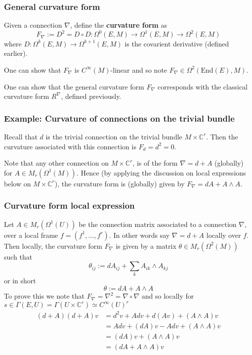 \documentclass[a4paper]{article}
\theoremstyle{definition} \newtheorem*{definition}{Definition}
\theoremstyle{definition} \newtheorem*{definitions}{Definitions}
\theoremstyle{plain} \newtheorem{theorem}{Theorem}[section]
\theoremstyle{plain} \newtheorem{proposition}[theorem]{Proposition}
\theoremstyle{plain} \newtheorem{corollary}[theorem]{Corollary}
\theoremstyle{plain} \newtheorem{lemma}[theorem]{Lemma}
\theoremstyle{plain} \newtheorem{example}[theorem]{Example}
\newcommand{\defn}[1]{\textbf{#1}}
\newcommand{\complexnos}{\mathbb{C}}
\newcommand{\End}{\text{End}}
\newcommand{\smooth}{C^\infty}
\begin{document}
\subsubsection{General curvature form}
Given a connection $\nabla$, define the \defn{curvature form} as
$$F_\nabla := D^2 = D\circ D: \Omega^0(E, M)\to \Omega^1(E, M) \to \Omega^2(E, M)$$
where $D:\Omega^k(E, M)\to \Omega^{k+1}(E, M)$ is the covarient derivative (defined earlier). 

One can show that $F_\nabla$ is $\smooth(M)$-linear and so note $F_\nabla \in \Omega^2(\End(E), M)$. 

One can show that the general curvature form $F_\nabla$ corresponds with the classical curvature form $R^\nabla$, defined previously.

\subsubsection{Example: Curvature of connections on the trivial bundle}
Recall that $d$ is the trivial connection on the trivial bundle $M\times \complexnos^r$. Then the curvature associated with this connection is
$F_d = d^2 = 0$.

Note that any other connection on $M\times \complexnos^r$, is of the form $\nabla = d+A$ (globally) for $A\in M_r(\Omega^1(M))$. Hence (by applying the discussion on local expressions below on $M\times \complexnos^r$), the curvature form is (globally) given by $F_\nabla = dA+A\wedge A$. 

\subsubsection{Curvature form local expression}
Let $A\in M_r(\Omega^1(U))$ be the connection matrix associated to a connection $\nabla$, over a local frame $f=(f^1, \ldots , f^r)$. In other words say $\nabla=d+A$ locally over $f$. Then locally, the curvature form $F_\nabla$ is given by a matrix $\theta \in M_r(\Omega^2(M))$ such that
$$\mathbb{\theta}_{ij} := dA_{ij} + \sum_k A_{ik}\wedge A_{kj}$$
or in short
$$\mathbb{\theta} := dA + A\wedge A$$
To prove this we note that $F_\nabla = \nabla^2 = \nabla \circ \nabla$ and so locally for $s\in \Gamma(E, U)=\Gamma(U\times \complexnos^r)\simeq \smooth(U)^r$
\begin{align*}
    (d+A)(d+A)v & = d^2 v + A dv + d(Av) + (A\wedge A) v \\
    & = A dv + (dA) v - A  dv + (A\wedge A) v \\
    & = (dA) v  + (A\wedge A) v \\
    & = (dA + A\wedge A) v
\end{align*}
\end{document}
